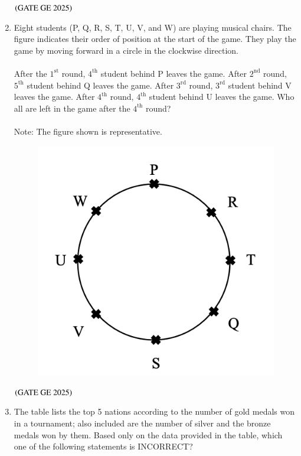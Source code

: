 \documentclass[journal,12pt,onecolumn]{IEEEtran}
\theoremstyle{remark}
\begin{document}
\begin{enumerate}
\begin{enumerate}
\end{enumerate}
\hfill $\left(\text{GATE GE 2025}\right)$
\bigskip
\item Eight students (P, Q, R, S, T, U, V, and W) are playing musical chairs. The figure indicates their order of position at the start of the game. They play the game by moving forward in a circle in the clockwise direction.\\
\\
After the $1^{\text{st}}$ round, $4^{\text{th}}$ student behind P leaves the game. After $2^{\text{nd}}$ round, $5^{\text{th}}$ student behind Q leaves the game. After $3^{\text{rd}}$ round, $3^{\text{rd}}$ student behind V leaves the game. After $4^{\text{th}}$ round, $4^{\text{th}}$ student behind U leaves the game. Who all are left in the game after the $4^{\text{th}}$ round?\\
\\
Note: The figure shown is representative.\\
\begin{figure}[H]
    \centering
    \includegraphics[width=0.4\columnwidth]{figs/fig3.png}
    \caption{}
    \label{figs:fig3}
\end{figure}
\begin{enumerate}
\end{enumerate}
\hfill $\left(\text{GATE GE 2025}\right)$
\bigskip
\item The table lists the top 5 nations according to the number of gold medals won in a tournament; also included are the number of silver and the bronze medals won by them. Based only on the data provided in the table, which one of the following statements is INCORRECT?

\end{enumerate}
\end{document}
